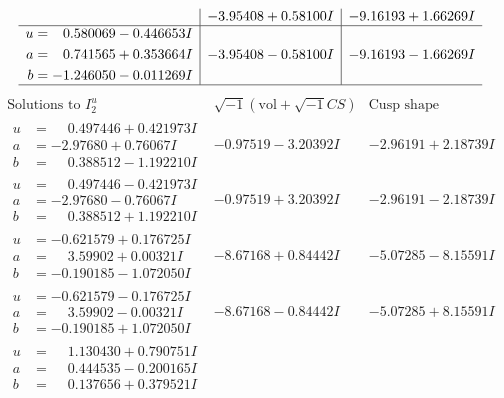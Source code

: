 \documentclass[1p]{elsarticle_modified}
\theoremstyle{definition}
\newcommand{\I}{\sqrt{-1}}
\begin{document}
$$\begin{array}{c|c|c}
 & -3.95408 + 0.58100 I & -9.16193 + 1.66269 I \\ \hline\begin{aligned}
u &= \phantom{-}0.580069 - 0.446653 I \\
a &= \phantom{-}0.741565 + 0.353664 I \\
b &= -1.246050 - 0.011269 I\end{aligned}
 & -3.95408 - 0.58100 I & -9.16193 - 1.66269 I\\
 \hline 
 \end{array}$$\newpage$$\begin{array}{c|c|c}  
\text{Solutions to }I^u_{2}& \I (\text{vol} + \sqrt{-1}CS) & \text{Cusp shape}\\
 \hline 
\begin{aligned}
u &= \phantom{-}0.497446 + 0.421973 I \\
a &= -2.97680 + 0.76067 I \\
b &= \phantom{-}0.388512 - 1.192210 I\end{aligned}
 & -0.97519 - 3.20392 I & -2.96191 + 2.18739 I \\ \hline\begin{aligned}
u &= \phantom{-}0.497446 - 0.421973 I \\
a &= -2.97680 - 0.76067 I \\
b &= \phantom{-}0.388512 + 1.192210 I\end{aligned}
 & -0.97519 + 3.20392 I & -2.96191 - 2.18739 I \\ \hline\begin{aligned}
u &= -0.621579 + 0.176725 I \\
a &= \phantom{-}3.59902 + 0.00321 I \\
b &= -0.190185 - 1.072050 I\end{aligned}
 & -8.67168 + 0.84442 I & -5.07285 - 8.15591 I \\ \hline\begin{aligned}
u &= -0.621579 - 0.176725 I \\
a &= \phantom{-}3.59902 - 0.00321 I \\
b &= -0.190185 + 1.072050 I\end{aligned}
 & -8.67168 - 0.84442 I & -5.07285 + 8.15591 I \\ \hline\begin{aligned}
u &= \phantom{-}1.130430 + 0.790751 I \\
a &= \phantom{-}0.444535 - 0.200165 I \\
b &= \phantom{-}0.137656 + 0.379521 I\end{aligned}

\end{array}$$
\end{document}
